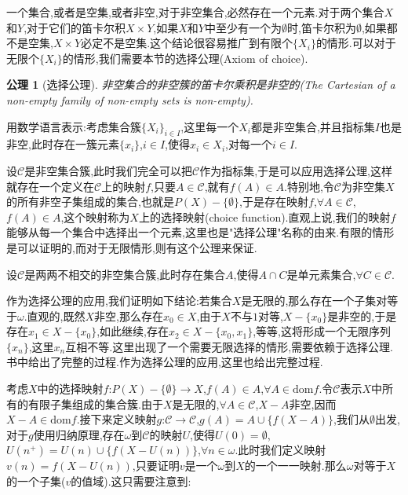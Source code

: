 \documentclass[12pt,a4paper,openany]{book}
\newtheorem{axiom}{公理}[section]
\begin{document}
一个集合,或者是空集,或者非空,对于非空集合,必然存在一个元素.对于两个集合$X$和$Y$,对于它们的笛卡尔积$X \times Y$,如果$X$和$Y$中至少有一个为$\emptyset$时,笛卡尔积为$\emptyset$,如果都不是空集,$X \times Y$必定不是空集.这个结论很容易推广到有限个$\{X_i\}$的情形.可以对于无限个$\{X_i\}$的情形,我们需要本节的选择公理(Axiom of choice).

\begin{axiom}[选择公理]
非空集合的非空簇的笛卡尔乘积是非空的(The Cartesian of a non-empty family of non-empty sets is non-empty).
\end{axiom}

用数学语言表示:考虑集合簇$\{X_i\}_{i \in I}$,这里每一个$X_i$都是非空集合,并且指标集$I$也是非空,此时存在一簇元素$\{x_i\}$,$i \in I$,使得$x_i \in X_i$,对每一个$i \in I$.

设$\mathscr{C}$是非空集合簇,此时我们完全可以把$\mathscr{C}$作为指标集,于是可以应用选择公理,这样就存在一个定义在$\mathscr{C}$上的映射$f$,只要$A \in \mathscr{C}$,就有$f(A) \in A$.特别地,令$\mathscr{C}$为非空集$X$的所有非空子集组成的集合,也就是$P(X)-\{\emptyset\}$,于是存在映射$f$,$\forall A \in \mathscr{C}$,$f(A) \in A$,这个映射称为$X$上的选择映射(choice function).直观上说,我们的映射$f$能够从每一个集合中选择出一个元素,这里也是"选择公理"名称的由来.有限的情形是可以证明的,而对于无限情形,则有这个公理来保证.

设$\mathscr{C}$是两两不相交的非空集合簇,此时存在集合$A$,使得$A \cap C$是单元素集合,$\forall C \in \mathscr{C}$.

作为选择公理的应用,我们证明如下结论:若集合$X$是无限的,那么存在一个子集对等于$\omega$.直观的,既然$X$非空,那么存在$x_0 \in X$,由于$X$不与$1$对等,$X-\{x_0\}$是非空的,于是存在$x_1 \in X - \{x_0\}$,如此继续,存在$x_2 \in X - \{x_0,x_1\}$,等等,这将形成一个无限序列$\{x_n\}$,这里$x_n$互相不等.这里出现了一个需要无限选择的情形,需要依赖于选择公理.书中给出了完整的过程.作为选择公理的应用,这里也给出完整过程.

考虑$X$中的选择映射$f$:$P(X)-\{\emptyset\} \to X$,$f(A) \in A$,$\forall A \in \text{dom}{f}$.令$\mathscr{C}$表示$X$中所有的有限子集组成的集合簇.由于$X$是无限的,$\forall A \in \mathscr{C}$,$X-A$非空,因而$X-A \in \text{dom}{f}$.接下来定义映射$g$:$\mathscr{C} \to \mathscr{C}$,$g(A)=A \cup \{f(X-A)\}$,我们从$\emptyset$出发,对于$g$使用归纳原理,存在$\omega$到$\mathscr{C}$的映射$U$,使得$U(0)=\emptyset$,$U(n^+)=U(n) \cup \{f(X-U(n))\}$,$\forall n \in \omega$.此时我们定义映射$v(n)=f(X-U(n))$,只要证明$v$是一个$\omega$到$X$的一个一一映射.那么$\omega$对等于$X$的一个子集($v$的值域).这只需要注意到:
\end{document}
